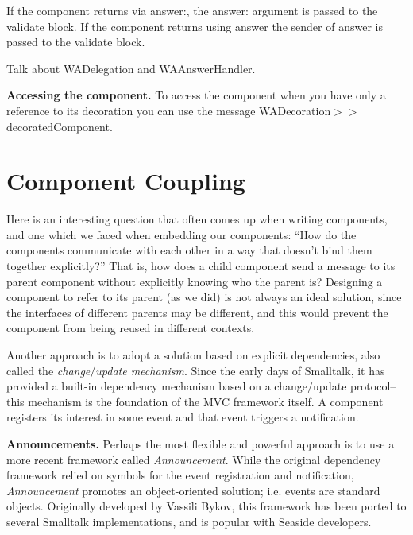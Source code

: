 \documentclass[a4paper,10pt,twoside]{book}
\newenvironment{todo}%
	{\obeylines\comment}%
	{\endtrivlist\normalsize}
\newcommand{\ct}[1]{{\small\ttfamily\textup{#1}}}
\begin{document}
If the component returns via \ct{answer:}, the \ct{answer:} argument is passed to the validate block. If the component returns using \ct{answer} the sender of \ct{answer} is passed to the validate block.

\begin{todo}
Talk about \ct{WADelegation} and \ct{WAAnswerHandler}.

\end{todo}

\textbf{Accessing the component.} To access the component when you have only a reference to its decoration you can use the message  \ct{WADecoration$>$$>$decoratedComponent}.

\section{Component Coupling}
\label{book:components:embedding:coupling}

Here is an interesting question that often comes up when writing components, and one which we faced when embedding our components: ``How do the components communicate with each other in a way that doesn't bind them together explicitly?'' That is, how does a child component send a message to its parent component without explicitly knowing who the parent is? Designing a component to refer to its parent (as we did) is not always an ideal solution, since the interfaces of different parents may be different, and this would prevent the component from being reused in different contexts.

Another approach is to adopt a solution based on explicit dependencies, also called the \textit{change$/$update mechanism}. Since the early days of Smalltalk, it has provided a built-in dependency mechanism based on a change$/$update protocol--this mechanism is the foundation of the MVC framework itself. A component registers its interest in some event and that event triggers a notification.

\textbf{Announcements.} Perhaps the most flexible and powerful approach is to use a more recent framework called \textit{Announcement}. While the original dependency framework relied on symbols for the event registration and notification, \textit{Announcement} promotes an object-oriented solution; i.e. events are standard objects. Originally developed by Vassili Bykov, this framework has been ported to several Smalltalk implementations, and is popular with Seaside developers. 
\end{document}
